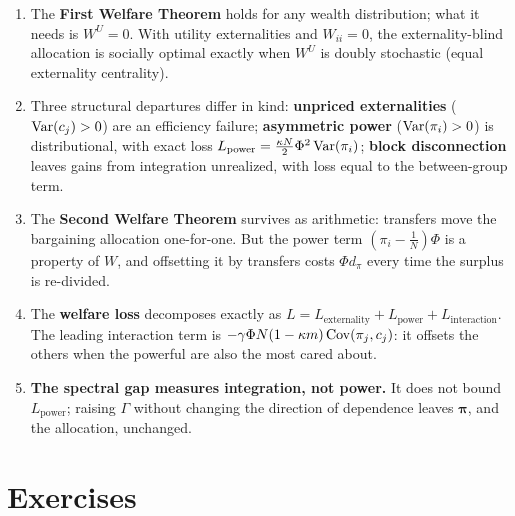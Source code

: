 \documentclass[../structural_economics_book.tex]{subfiles}
\begin{document}
\begin{enumerate}
\item The \textbf{First Welfare Theorem} holds for any wealth distribution; what it needs is $W^U = 0$. With utility externalities and $W_{ii} = 0$, the externality-blind allocation is socially optimal exactly when $W^U$ is doubly stochastic (equal externality centrality).

\item Three structural departures differ in kind: \textbf{unpriced externalities} ($\operatorname{Var}(c_j) > 0$) are an efficiency failure; \textbf{asymmetric power} ($\operatorname{Var}(\pi_i) > 0$) is distributional, with exact loss $L_{\text{power}} = \frac{\kappa N}{2}\Phi^2\operatorname{Var}(\pi_i)$; \textbf{block disconnection} leaves gains from integration unrealized, with loss equal to the between-group term.

\item The \textbf{Second Welfare Theorem} survives as arithmetic: transfers move the bargaining allocation one-for-one. But the power term $(\pi_i - \frac1N)\Phi$ is a property of $W$, and offsetting it by transfers costs $\Phi d_\pi$ every time the surplus is re-divided.

\item The \textbf{welfare loss} decomposes exactly as $L = L_{\text{externality}} + L_{\text{power}} + L_{\text{interaction}}$. The leading interaction term is $-\gamma\Phi N(1-\kappa m)\operatorname{Cov}(\pi_j, c_j)$: it offsets the others when the powerful are also the most cared about.

\item \textbf{The spectral gap measures integration, not power.} It does not bound $L_{\text{power}}$; raising $\Gamma$ without changing the direction of dependence leaves $\boldsymbol{\pi}$, and the allocation, unchanged.
\end{enumerate}


\section{Exercises}
\label{ch02:sec:exercises}
\end{document}
